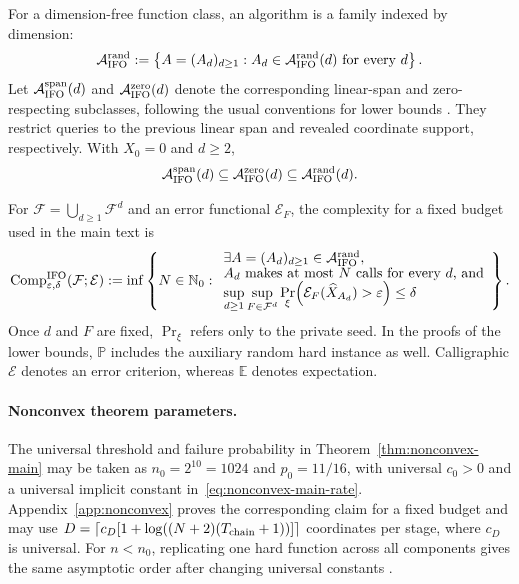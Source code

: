 \documentclass{article}
\newcommand{\E}{\mathbb{E}}
\theoremstyle{definition}
\newcommand{\Prob}{\mathbb{P}}
\begin{document}
For a dimension-free function class, an algorithm is a family indexed by dimension:
\begin{equation}
 \mathcal A_{\rm IFO}^{\rm rand}
 :=\left\{A=(A_d)_{d\ge1}:A_d\in
 \mathcal A_{\rm IFO}^{\rm rand}(d)\ \text{for every }d\right\}.
 \label{eq:dimension-indexed-algorithms}
\end{equation}
Let $\mathcal A_{\rm IFO}^{\rm span}(d)$ and
$\mathcal A_{\rm IFO}^{\rm zero}(d)$ denote the corresponding linear-span and
zero-respecting subclasses, following the usual conventions for lower bounds
\citep{zhou2019lower,carmon2021lower2}.  They restrict queries to the previous
linear span and revealed coordinate support, respectively.  With $X_0=0$ and
$d\ge2$,
\begin{equation}
 \mathcal A_{\rm IFO}^{\rm span}(d)
 \subseteq\mathcal A_{\rm IFO}^{\rm zero}(d)
 \subseteq\mathcal A_{\rm IFO}^{\rm rand}(d).
 \label{eq:algorithm-containment}
\end{equation}

For $\mathcal F=\bigcup_{d\ge1}\mathcal F^d$ and an error functional
$\mathcal E_F$, the complexity for a fixed budget used in the main text is
\begin{equation}
 \operatorname{Comp}_{\varepsilon,\delta}^{\rm IFO}
 (\mathcal F;\mathcal E)
 :=\inf\left\{N\in\mathbb N_0:
 \begin{array}{l}
 \exists A=(A_d)_{d\ge1}\in\mathcal A_{\rm IFO}^{\rm rand},\\[-1pt]
 \text{$A_d$ makes at most $N$ calls for every $d$, and}\\[-1pt]
 \displaystyle\sup_{d\ge1}\sup_{F\in\mathcal F^d}
 \Pr_{\xi}\!\left(\mathcal E_F(\widehat X_{A_d})>\varepsilon\right)
 \le\delta
 \end{array}\right\}.
 \label{eq:ifo-complexity}
\end{equation}
Once $d$ and $F$ are fixed, $\Pr_\xi$ refers only to the private seed.  In the
proofs of the lower bounds, $\Prob$ includes the auxiliary random hard instance as
well.  Calligraphic $\mathcal E$ denotes an error criterion, whereas $\E$
denotes expectation.

\paragraph{Nonconvex theorem parameters.}
The universal threshold and failure probability in
Theorem~\ref{thm:nonconvex-main} may be taken as
$n_0=2^{10}=1024$ and $p_0=11/16$, with universal $c_0>0$ and a universal
implicit constant in~\eqref{eq:nonconvex-main-rate}.
Appendix~\ref{app:nonconvex} proves the corresponding
claim for a fixed budget and may use
$D=\lceil c_D[1+\log((N+2)(T_{\rm chain}+1))]\rceil$ coordinates per stage,
where $c_D$ is universal.  For $n<n_0$, replicating one hard function across all
components gives the same asymptotic order after changing
universal constants
\citep{carmon2021lower2,emmenegger2022oracle}.
\end{document}
